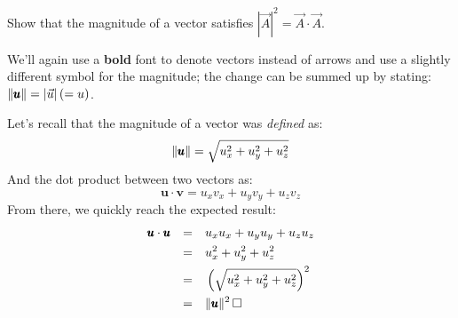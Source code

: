 \documentclass[solutions.tex]{subfiles}
\begin{document}
\maketitle
\begin{exercise} Show that the magnitude of a vector satisfies
$|\vec{A}|^2 = \vec{A}\cdot\vec{A}$.
\end{exercise}
\begin{remark} We'll again use a \textbf{bold} font to denote
vectors instead of arrows and use a slightly different symbol
for the magnitude; the change can be summed up by stating:
$\lVert \pmb{u} \rVert = |\vec{u}|\, (= u)$.
\end{remark}
Let's recall that the magnitude of a vector was \textit{defined} as:
\[
	\lVert \pmb{u} \rVert = \sqrt{u_x^2 + u_y^2 + u_z^2}
\]
And the dot product between two vectors as:
\[
	\bm{u}\cdot\bm{v} = u_xv_x + u_yv_y + u_zv_z
\]
From there, we quickly reach the expected result:
\begin{equation*} \begin{aligned}
	\bm{u}\cdot\bm{u} &&=\quad& u_xu_x + u_yu_y + u_zu_z \\
	~ &&=\quad& u_x^2 + u_y^2 + u_z^2 \\
	~ &&=\quad& \left(\sqrt{u_x^2 + u_y^2 + u_z^2}\right)^2 \\
	~ &&=\quad& \norm{\bm{u}}^2 \qed
\end{aligned} \end{equation*}
\end{document}
